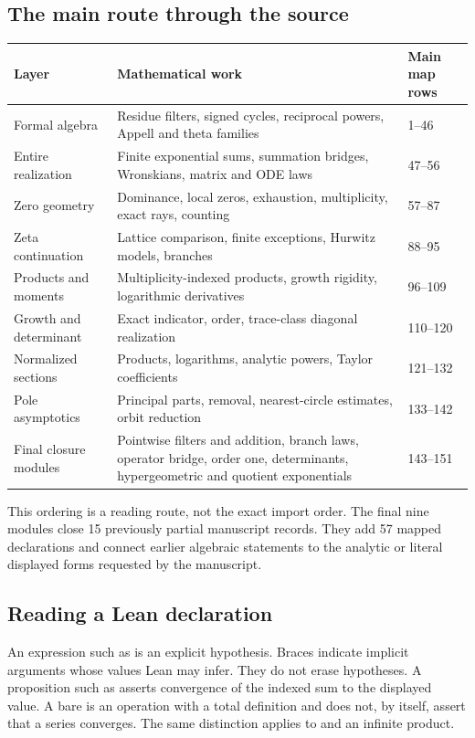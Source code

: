 \subsection{The main route through the source}
\begin{longtable}{p{}p{}p{}}
\toprule Layer & Mathematical work & Main map rows \\ \midrule\endhead
Formal algebra & Residue filters, signed cycles, reciprocal powers, Appell and theta families & 1--46 \\
Entire realization & Finite exponential sums, summation bridges, Wronskians, matrix and ODE laws & 47--56 \\
Zero geometry & Dominance, local zeros, exhaustion, multiplicity, exact rays, counting & 57--87 \\
Zeta continuation & Lattice comparison, finite exceptions, Hurwitz models, branches & 88--95 \\
Products and moments & Multiplicity-indexed products, growth rigidity, logarithmic derivatives & 96--109 \\
Growth and determinant & Exact indicator, order, trace-class diagonal realization & 110--120 \\
Normalized sections & Products, logarithms, analytic powers, Taylor coefficients & 121--132 \\
Pole asymptotics & Principal parts, removal, nearest-circle estimates, orbit reduction & 133--142 \\
Final closure modules & Pointwise filters and addition, branch laws, operator bridge, order one, determinants, hypergeometric and quotient exponentials & 143--151 \\
\bottomrule
\end{longtable}
This ordering is a reading route, not the exact import order. The final nine modules close 15 previously partial manuscript records. They add 57 mapped declarations and connect earlier algebraic statements to the analytic or literal displayed forms requested by the manuscript.

\subsection{Reading a Lean declaration}
An expression such as  is an explicit hypothesis. Braces indicate implicit arguments whose values Lean may infer. They do not erase hypotheses. A proposition such as  asserts convergence of the indexed sum to the displayed value. A bare  is an operation with a total definition and does not, by itself, assert that a series converges. The same distinction applies to  and an infinite product.

